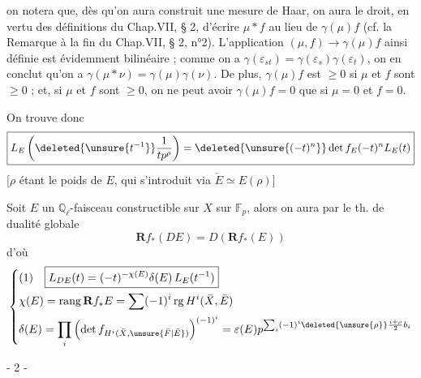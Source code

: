 on notera que, dès qu'on aura construit une mesure de Haar, on aura le droit, en vertu des définitions du Chap.VII, § 2, d'écrire $\mu*f$ au lieu de $\gamma(\mu)f$ (cf. la Remarque à la fin du Chap.VII, § 2, n°2). L'application $(\mu,f)\longrightarrow\gamma(\mu)f$ ainsi définie est évidemment bilinéaire ; comme on a $\gamma(\varepsilon_{st})=\gamma(\varepsilon_s)\gamma(\varepsilon_t)$, on en conclut qu'on a $\gamma(\mu*\nu)=\gamma(\mu)\gamma(\nu)$. De plus, $\gamma(\mu)f$ est $\geq0$ si $\mu$ et $f$ sont $\geq0$ ; et, si $\mu$ et $f$ sont $\geq0$, on ne peut avoir $\gamma(\mu)f=0$ que si $\mu=0$ et $f=0$.

On trouve donc
\[
\boxed{L_E\left(\deleted{\unsure{t^{-1}}}\frac{1}{tp^{\rho}}\right)=\deleted{\unsure{(-t)^n}}\det f_E(-t)^nL_E(t)}
\]
[$\rho$ étant le poids de $E$, qui s'introduit via $\check E\simeq E(\rho)$]


Soit $E$ un $\mathbb{Q}_{\ell}$-faisceau constructible sur $X$   sur $\mathbb{F}_p$, alors on aura
\deleted{
\[
H_c^i(X,DE)\simeq D(H^{-i}(X,E))
\]
}
par le th. de dualité globale
\[
\mathbf{R}f_*(DE)=D(\mathbf{R}f_*(E))
\]
d'où
\[
\left\{\begin{aligned}
&\text{(1)}\quad\boxed{L_{DE}(t)=(-t)^{-\chi(E)}\delta(E)\,L_E(t^{-1})}\\
&\chi(E)=\operatorname{rang}\mathbf{R}f_*E=\sum(-1)^i\operatorname{rg}H^i(\bar X,\bar E)\\
&\delta(E)=\prod_i\left(\det f_{H^i(\bar X,\unsure{\bar F|\bar E})}\right)^{(-1)^i}=\varepsilon(E)p^{\sum_i(-1)^i\deleted{\unsure{\rho}}\frac{i+\rho}{2}b_i}
\end{aligned}\right.
\]


\begin{center}- 2 -\end{center}

